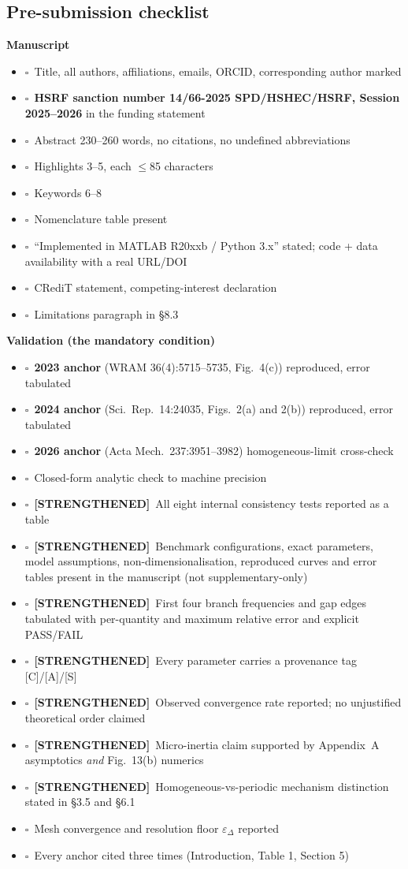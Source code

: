 \documentclass[11pt,a4paper]{article}
\newcommand{\STR}{{\color{strcol}\textbf{[STRENGTHENED]}}}
\newcommand{\chk}{$\square$~}
\begin{document}
\subsection{Pre-submission checklist}

\textbf{Manuscript}
\begin{itemize}
\item \chk Title, all authors, affiliations, emails, ORCID, corresponding author marked
\item \chk \textbf{HSRF sanction number 14/66-2025 SPD/HSHEC/HSRF, Session 2025--2026} in the funding statement
\item \chk Abstract 230--260 words, no citations, no undefined abbreviations
\item \chk Highlights 3--5, each $\le$85 characters
\item \chk Keywords 6--8
\item \chk Nomenclature table present
\item \chk ``Implemented in MATLAB R20xxb / Python 3.x'' stated; code + data availability with a real URL/DOI
\item \chk CRediT statement, competing-interest declaration
\item \chk Limitations paragraph in \S8.3
\end{itemize}

\textbf{Validation (the mandatory condition)}
\begin{itemize}
\item \chk \textbf{2023 anchor} (WRAM 36(4):5715--5735, Fig.~4(c)) reproduced, error tabulated
\item \chk \textbf{2024 anchor} (Sci.\ Rep.\ 14:24035, Figs.~2(a) and 2(b)) reproduced, error tabulated
\item \chk \textbf{2026 anchor} (Acta Mech.\ 237:3951--3982) homogeneous-limit cross-check
\item \chk Closed-form analytic check to machine precision
\item \chk \STR\ All eight internal consistency tests reported as a table
\item \chk \STR\ Benchmark configurations, exact parameters, model assumptions, non-dimensionalisation, reproduced curves and error tables present in the manuscript (not supplementary-only)
\item \chk \STR\ First four branch frequencies and gap edges tabulated with per-quantity and maximum relative error and explicit PASS/FAIL
\item \chk \STR\ Every parameter carries a provenance tag [C]/[A]/[S]
\item \chk \STR\ Observed convergence rate reported; no unjustified theoretical order claimed
\item \chk \STR\ Micro-inertia claim supported by Appendix~A asymptotics \emph{and} Fig.~13(b) numerics
\item \chk \STR\ Homogeneous-vs-periodic mechanism distinction stated in \S3.5 and \S6.1
\item \chk Mesh convergence and resolution floor $\varepsilon_\Delta$ reported
\item \chk Every anchor cited three times (Introduction, Table 1, Section 5)
\end{itemize}
\end{document}
